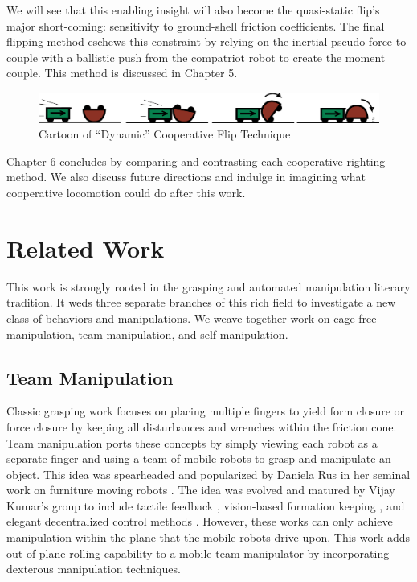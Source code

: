 \documentclass[letterpaper]{report}
\begin{document}
We will see that this enabling insight will also become the quasi-static flip's major short-coming: sensitivity to ground-shell friction coefficients.
The final flipping method eschews this constraint by relying on the inertial pseudo-force to couple with a ballistic push from the compatriot robot to create the moment couple.
This method is discussed in Chapter 5.

\begin{figure}[ht]
\centering
\includegraphics[width=1.0\textwidth]{Dynamic_CoopCartoon.png}
\caption{Cartoon of ``Dynamic'' Cooperative Flip Technique}
\end{figure}

Chapter 6 concludes by comparing and contrasting each cooperative righting method.
We also discuss future directions and indulge in imagining what cooperative locomotion could do after this work.

\section{Related Work}

This work is strongly rooted in the grasping and automated manipulation literary tradition.
It weds three separate branches of this rich field to investigate a new class of behaviors and manipulations.
We weave together work on cage-free manipulation, team manipulation, and self manipulation.

\subsection{Team Manipulation}
Classic grasping work focuses on placing multiple fingers to yield form closure or force closure by keeping all disturbances and wrenches within the friction cone.
Team manipulation ports these concepts by simply viewing each robot as a separate finger and using a team of mobile robots to grasp and manipulate an object.
This idea was spearheaded and popularized by Daniela Rus in her seminal work on furniture moving robots \cite{rus1995moving}.
The idea was evolved and matured by Vijay Kumar's group to include tactile feedback \cite{sugar2002control}, vision-based formation keeping \cite{spletzer2001cooperative}, and elegant decentralized control methods \cite{song2002potential}.
However, these works can only achieve manipulation within the plane that the mobile robots drive upon.
This work adds out-of-plane rolling capability to a mobile team manipulator by incorporating dexterous manipulation techniques.
\end{document}
